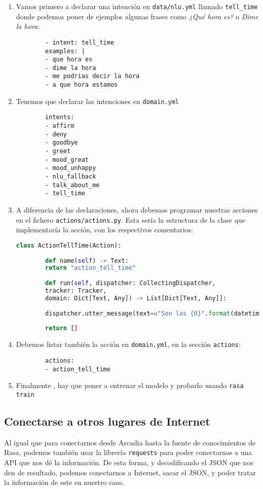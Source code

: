 \begin{enumerate}
	\item Vamos primero a declarar una intención en \texttt{data/nlu.yml} llamado \texttt{tell\_time} donde podemos poner de ejemplos algunas frases como \textit{¿Qué hora es?} o \textit{Dime la hora}:
	\begin{lstlisting}
		- intent: tell_time
		examples: |
		- que hora es
		- dime la hora
		- me podrias decir la hora
		- a que hora estamos
	\end{lstlisting}
	
	\item Tenemos que declarar las intenciones en \texttt{domain.yml}
	\begin{lstlisting}
		intents:
		- affirm
		- deny
		- goodbye
		- greet
		- mood_great
		- mood_unhappy
		- nlu_fallback
		- talk_about_me
		- tell_time
	\end{lstlisting}

	\item A diferencia de las declaraciones, ahora debemos programar nuestras acciones en el fichero \texttt{actions/actions.py}. Esta sería la estructura de la clase que implementaría la acción, con los respectivos comentarios:

	\begin{lstlisting}[language=Python]
		class ActionTellTime(Action):
		
		def name(self) -> Text:
		return "action_tell_time"
		
		def run(self, dispatcher: CollectingDispatcher,
		tracker: Tracker,
		domain: Dict[Text, Any]) -> List[Dict[Text, Any]]:
		
		dispatcher.utter_message(text=u"Son las {0}".format(datetime.datetime.now().strftime('%H horas y %M minutos')))
		
		return []
	\end{lstlisting}

	\item Debemos listar también la acción en \texttt{domain.yml}, en la sección \texttt{actions}:
	\begin{lstlisting}
		actions:
		- action_tell_time
	\end{lstlisting}
	
	\item Finalmente , hay que poner a entrenar el modelo y probarlo usando \texttt{rasa train}
\end{enumerate}

\subsection{Conectarse a otros lugares de Internet}
Al igual que para conectarnos desde Arcadia hasta la fuente de conocimientos de Rasa, podemos también usar la librería \texttt{requests} para poder conectarnos a una API que nos dé la información. De esta forma, y decodificando el JSON que nos den de resultado, podemos conectarnos a Internet, sacar el JSON, y poder tratar la información de este en nuestro caso.


